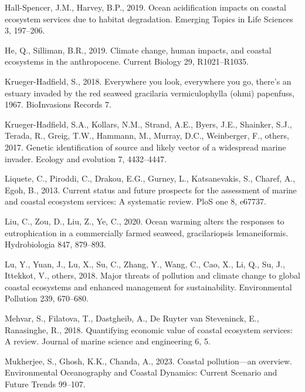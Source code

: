 \documentclass[
  letterpaper,
  DIV=11,
  numbers=noendperiod]{scrartcl}
\newlength{\cslhangindent}
\newenvironment{CSLReferences}[2] %
 {\begin{list}{}{%
  \setlength{\itemindent}{0pt}
  \setlength{\leftmargin}{0pt}
  \setlength{\parsep}{0pt}
  \ifodd #1
   \setlength{\leftmargin}{\cslhangindent}
   \setlength{\itemindent}{-1\cslhangindent}
  \fi
  \setlength{\itemsep}{#2\baselineskip}}}
 {\end{list}}
\begin{document}
\begin{CSLReferences}{1}{0}
Hall-Spencer, J.M., Harvey, B.P., 2019. Ocean acidification impacts on
coastal ecosystem services due to habitat degradation. Emerging Topics
in Life Sciences 3, 197--206.

He, Q., Silliman, B.R., 2019. Climate change, human impacts, and coastal
ecosystems in the anthropocene. Current Biology 29, R1021--R1035.

Krueger-Hadfield, S., 2018. Everywhere you look, everywhere you go,
there's an estuary invaded by the red seaweed gracilaria vermiculophylla
(ohmi) papenfuss, 1967. BioInvasions Records 7.

Krueger-Hadfield, S.A., Kollars, N.M., Strand, A.E., Byers, J.E.,
Shainker, S.J., Terada, R., Greig, T.W., Hammann, M., Murray, D.C.,
Weinberger, F., others, 2017. Genetic identification of source and
likely vector of a widespread marine invader. Ecology and evolution 7,
4432--4447.

Liquete, C., Piroddi, C., Drakou, E.G., Gurney, L., Katsanevakis, S.,
Charef, A., Egoh, B., 2013. Current status and future prospects for the
assessment of marine and coastal ecosystem services: A systematic
review. PloS one 8, e67737.

Liu, C., Zou, D., Liu, Z., Ye, C., 2020. Ocean warming alters the
responses to eutrophication in a commercially farmed seaweed,
gracilariopsis lemaneiformis. Hydrobiologia 847, 879--893.

Lu, Y., Yuan, J., Lu, X., Su, C., Zhang, Y., Wang, C., Cao, X., Li, Q.,
Su, J., Ittekkot, V., others, 2018. Major threats of pollution and
climate change to global coastal ecosystems and enhanced management for
sustainability. Environmental Pollution 239, 670--680.

Mehvar, S., Filatova, T., Dastgheib, A., De Ruyter van Steveninck, E.,
Ranasinghe, R., 2018. Quantifying economic value of coastal ecosystem
services: A review. Journal of marine science and engineering 6, 5.

Mukherjee, S., Ghosh, K.K., Chanda, A., 2023. Coastal pollution---an
overview. Environmental Oceanography and Coastal Dynamics: Current
Scenario and Future Trends 99--107.


\end{CSLReferences}
\end{document}
